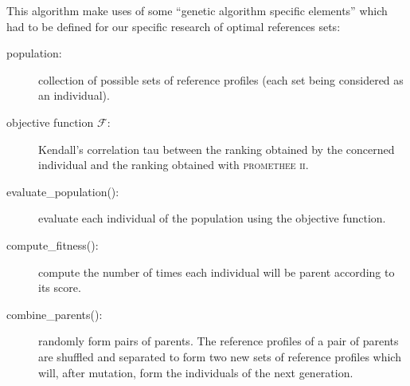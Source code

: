 This algorithm make uses of some ``genetic algorithm specific elements'' which had to be defined for our specific research of optimal references sets:
\begin{description}
    \item[population: ] collection of possible sets of reference profiles (each set being considered as an individual).
    \item[objective function $\mathcal{F}$: ] Kendall's correlation tau between the ranking obtained by the concerned individual and the ranking obtained with \textsc{promethee ii}.  
    \item[evaluate\_population(): ] evaluate each individual of the population using the objective function.
    \item[compute\_fitness(): ] compute the number of times each individual will be parent according to its score.
    \item[combine\_parents(): ] randomly form pairs of parents. The reference profiles of a pair of parents are shuffled and separated to form two new sets of reference profiles which will, after mutation, form the individuals of the next generation.


\end{description}
